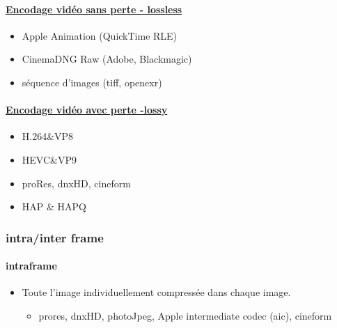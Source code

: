 \documentclass[
]{book}
\providecommand{\tightlist}{%
  \setlength{\itemsep}{0pt}\setlength{\parskip}{0pt}}
\begin{document}
\hypertarget{encodage-viduxe9o-sans-perte---lossless}{%
\paragraph{\texorpdfstring{\href{https://en.wikipedia.org/wiki/List_of_codecs\#Lossless_video_compression}{Encodage vidéo sans perte - lossless}}{Encodage vidéo sans perte - lossless}}\label{encodage-viduxe9o-sans-perte---lossless}}

\begin{itemize}
\tightlist
\item
  Apple Animation (QuickTime RLE)
\item
  CinemaDNG Raw (Adobe, Blackmagic)
\item
  séquence d'images (tiff, openexr)
\end{itemize}

\hypertarget{encodage-viduxe9o-avec-perte--lossy}{%
\paragraph{\texorpdfstring{\href{https://en.wikipedia.org/wiki/List_of_codecs\#Lossy_compression_2}{Encodage vidéo avec perte -lossy}}{Encodage vidéo avec perte -lossy}}\label{encodage-viduxe9o-avec-perte--lossy}}

\begin{itemize}
\tightlist
\item
  H.264\&VP8
\item
  HEVC\&VP9
\item
  proRes, dnxHD, cineform\\
\item
  HAP \& HAPQ
\end{itemize}

\hypertarget{intrainter-frame}{%
\subsubsection{intra/inter frame}\label{intrainter-frame}}

\hypertarget{intraframe}{%
\paragraph{intraframe}\label{intraframe}}

\begin{itemize}
\tightlist
\item
  Toute l'image individuellement compressée dans chaque image.

  \begin{itemize}
  \tightlist
  \item
    prores, dnxHD, photoJpeg, Apple intermediate codec (aic), cineform
  \end{itemize}
\end{itemize}
\end{document}
